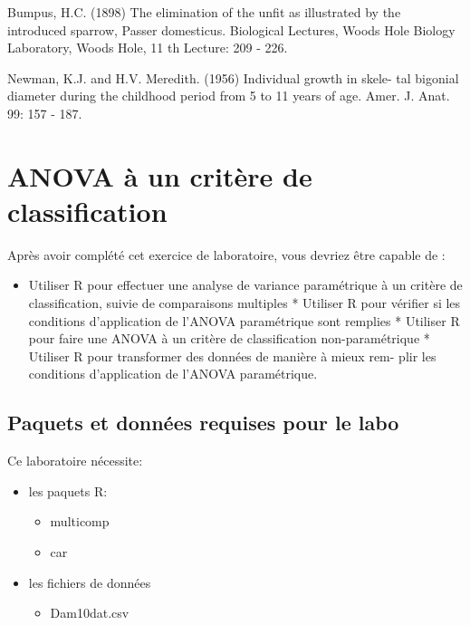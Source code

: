\documentclass[12pt,]{book}
\providecommand{\tightlist}{%
  \setlength{\itemsep}{0pt}\setlength{\parskip}{0pt}}
\begin{document}
Bumpus, H.C. (1898) The elimination of the unfit as illustrated by the introduced sparrow, Passer domesticus. Biological Lectures, Woods Hole Biology Laboratory, Woods Hole, 11 th Lecture: 209 - 226.

Newman, K.J. and H.V. Meredith. (1956) Individual growth in skele- tal bigonial diameter during the childhood period from 5 to 11 years of age. Amer. J. Anat. 99: 157 - 187.

\hypertarget{anova-uxe0-un-crituxe8re-de-classification}{%
\chapter{ANOVA à un critère de classification}\label{anova-uxe0-un-crituxe8re-de-classification}}

Après avoir complété cet exercice de laboratoire, vous devriez être capable de :

\begin{itemize}
\tightlist
\item
  Utiliser R pour effectuer une analyse de variance paramétrique à un critère de classification, suivie de comparaisons multiples * Utiliser R pour vérifier si les conditions d'application de l'ANOVA paramétrique sont remplies * Utiliser R pour faire une ANOVA à un critère de classification non-paramétrique * Utiliser R pour transformer des données de manière à mieux rem- plir les conditions d'application de l'ANOVA paramétrique.
\end{itemize}

\hypertarget{set-ano}{%
\section{Paquets et données requises pour le labo}\label{set-ano}}

Ce laboratoire nécessite:

\begin{itemize}
\tightlist
\item
  les paquets R:

  \begin{itemize}
  \tightlist
  \item
    multicomp
  \item
    car
  \end{itemize}
\item
  les fichiers de données

  \begin{itemize}
  \tightlist
  \item
    Dam10dat.csv
  \end{itemize}
\end{itemize}
\end{document}
